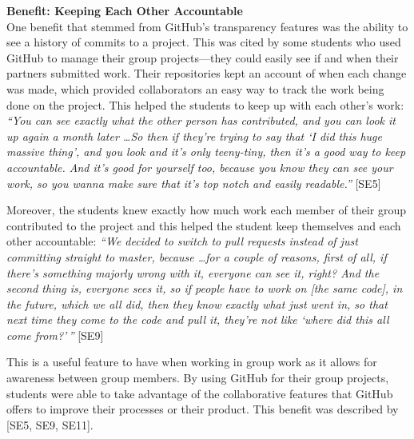 
\textbf{Benefit: Keeping Each Other Accountable} \\
One benefit that stemmed from GitHub's transparency features was the ability to see a history of commits to a project. This was cited by some students who used GitHub to manage their group projects---they could easily see if and when their partners submitted work. Their repositories kept an account of when each change was made, which provided collaborators an easy way to track the work being done on the project. This helped the students to keep up with each other's work: \textit{``You can see exactly what the other person has contributed, and you can look it up again a month later \ldots So then if they're trying to say that `I did this huge massive thing', and you look and it's only teeny-tiny, then it's a good way to keep accountable. And it's good for yourself too, because you know they can see your work, so you wanna make sure that it's top notch and easily readable.''} [SE5]


Moreover, the students knew exactly how much work each member of their group contributed to the project and this helped the student keep themselves and each other accountable: \textit{``We decided to switch to pull requests instead of just committing straight to master, because \ldots for a couple of reasons, first of all, if there's something majorly wrong with it, everyone can see it, right? And the second thing is, everyone sees it, so if people have to work on [the same code], in the future, which we all did, then they know exactly what just went in, so that next time they come to the code and pull it, they're not like `where did this all come from?'\,''} [SE9]

This is a useful feature to have when working in group work as it allows for awareness between group members. By using GitHub for their group projects, students were able to take advantage of the collaborative features that GitHub offers to improve their processes or their product. This benefit was described by [SE5, SE9, SE11]. \\


